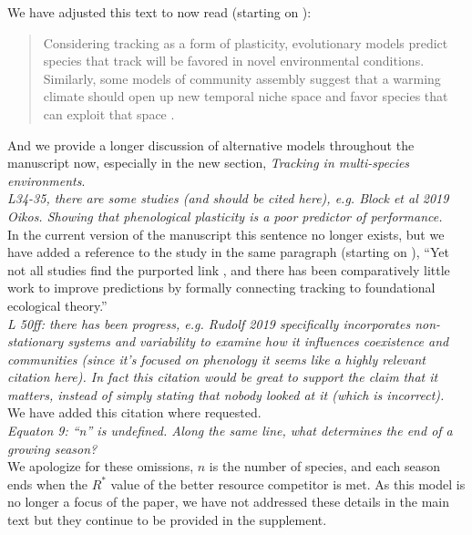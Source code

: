 \documentclass[11pt]{article}
\begin{document}
We have adjusted this text to now read (starting on ):
\begin{quote}
Considering tracking as a form of plasticity, evolutionary models predict species that track will be favored in novel environmental conditions. Similarly, some models of community assembly suggest that a warming climate should open up new temporal niche space and favor species that can exploit that space \citep{gotelli1996,wolkovich:2010fee,Zettlemoyer2019}.
\end{quote}
And we provide a longer discussion of alternative models throughout the manuscript now, especially in the new section, \emph{Tracking in multi-species environments}.\\

\emph{L34-35, there are some studies (and should be cited here), e.g. Block et al 2019 Oikos.
Showing that phenological plasticity is a poor predictor of performance.}\\

In the current version of the manuscript this sentence no longer exists, but we have added a reference to the study in the same paragraph (starting on ), ``Yet not all studies find the purported link \citep[e.g.,][]{block2019}, and there has been comparatively little work to improve predictions by formally connecting tracking to foundational ecological theory.''\\

\emph{L 50ff: there has been progress, e.g. Rudolf 2019 specifically incorporates non-stationary
systems and variability to examine how it influences coexistence and communities (since it's
focused on phenology it seems like a highly relevant citation here). In fact this citation
would be great to support the claim that it matters, instead of simply stating that nobody
looked at it (which is incorrect).}\\

We have added this citation where requested.\\

\emph{Equaton 9: ``n'' is undefined. Along the same line, what determines the end of a growing
season?}\\

We apologize for these omissions, $n$ is the number of species, and each season ends when the $R^*$ value of the better resource competitor is met. As this model is no longer a focus of the paper, we have not addressed these details in the main text but they continue to be provided in the supplement.\\
\end{document}
